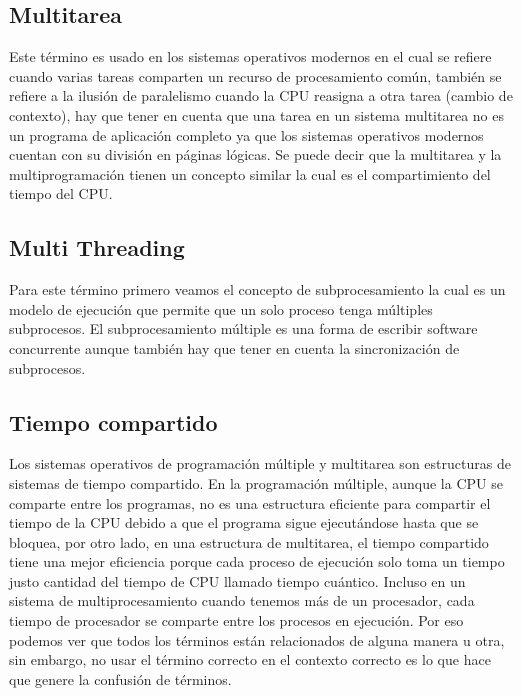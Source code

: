 \documentclass[conference,letterpaper]{IEEEtran}
\begin{document}
\subsection{Multitarea}
Este t\'{e}rmino es usado en los sistemas operativos modernos en el cual se refiere cuando varias tareas comparten un recurso de  procesamiento  com\'{u}n,  tambi\'{e}n  se  refiere  a  la  ilusi\'{o}n  de paralelismo  cuando  la  CPU  reasigna  a  otra  tarea  (cambio  de contexto), hay que tener en cuenta que una tarea en un sistema multitarea no es un programa de aplicaci\'{o}n completo ya que los  sistemas  operativos  modernos  cuentan  con  su  divisi\'{o}n en  p\'{a}ginas  l\'{o}gicas.  Se  puede  decir  que  la  multitarea  y  la multiprogramaci\'{o}n  tienen  un  concepto  similar  la  cual  es  el compartimiento del tiempo del CPU.

\subsection{Multi Threading}
Para este término primero veamos el concepto de subprocesamiento la cual es un modelo de ejecución que permite que un solo proceso tenga múltiples subprocesos. El subprocesamiento múltiple es una forma de escribir software concurrente aunque también hay que tener en cuenta la sincronización de subprocesos.

\subsection{Tiempo compartido}
Los sistemas operativos de programación múltiple y multitarea son estructuras de sistemas de tiempo compartido. En la programación múltiple, aunque la CPU se comparte entre los programas, no es una estructura eficiente para compartir el tiempo de la CPU debido a que el programa sigue ejecutándose hasta que se bloquea, por otro lado, en una estructura de multitarea, el tiempo compartido tiene una mejor eficiencia porque cada proceso de ejecución solo toma un tiempo justo cantidad del tiempo de CPU llamado tiempo cuántico. Incluso en un sistema de multiprocesamiento cuando tenemos más de un procesador, cada tiempo de procesador se comparte entre los procesos en ejecución. Por eso podemos ver que todos los términos están relacionados de alguna manera u otra, sin embargo, no usar el término correcto en el contexto correcto es lo que hace que genere la confusión de términos.\\
\end{document}
